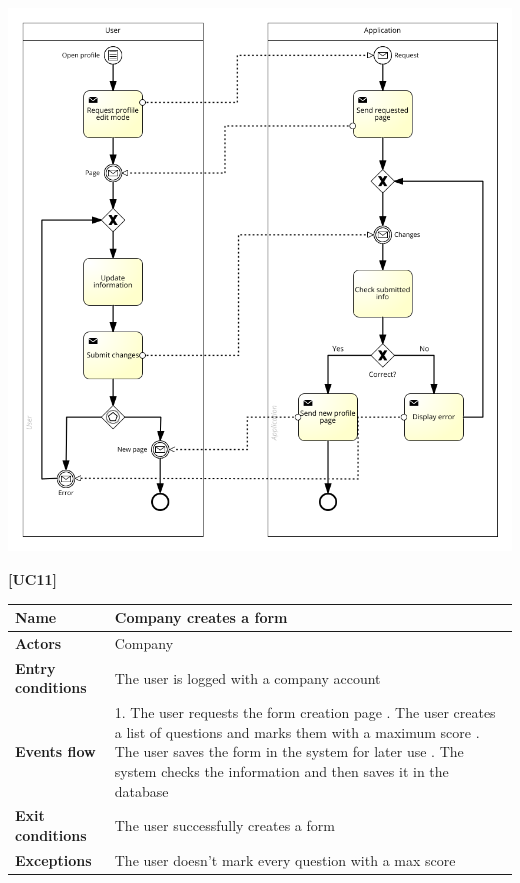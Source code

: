 \documentclass[11pt,twoside]{article}
\begin{document}
\begin{center}
\includegraphics[width=\textwidth]{Images/UC10}
\end{center}

\newpage

\large{\textbf{[UC11]}}
\begin{table}[H]
\begin{tabular}{| p{} | p{} |}
\hline
\textbf{Name}
& Company creates a form \\
\hline
\textbf{Actors}
& Company \\
\hline
\textbf{Entry conditions}
& The user is logged with a company account \\
\hline
\textbf{Events flow}
& 1. The user requests the form creation page \newline
2. The user creates a list of questions and marks them with a maximum score \newline
3. The user saves the form in the system for later use \newline
4. The system checks the information and then saves it in the database \\
\hline
\textbf{Exit conditions}
& The user successfully creates a form \\
\hline
\textbf{Exceptions}
& The user doesn't mark every question with a max score \\
\hline
\end{tabular}
\end{table}
\end{document}
